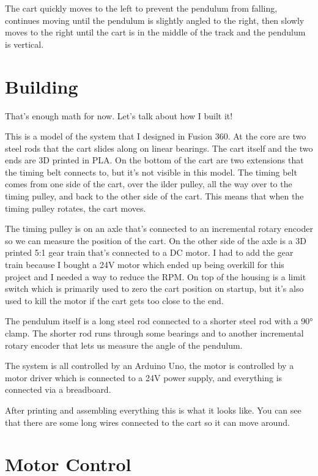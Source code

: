 \documentclass{article}
\begin{document}
The cart quickly moves to the left to prevent the pendulum from falling, continues moving until the pendulum is slightly angled to the right, then slowly moves to the right until the cart is in the middle of the track and the pendulum is vertical.

\section{Building}

That's enough math for now. Let's talk about how I built it!

This is a model of the system that I designed in Fusion 360. At the core are two steel rods that the cart slides along on linear bearings. The cart itself and the two ends are 3D printed in PLA. On the bottom of the cart are two extensions that the timing belt connects to, but it's not visible in this model. The timing belt comes from one side of the cart, over the ilder pulley, all the way over to the timing pulley, and back to the other side of the cart. This means that when the timing pulley rotates, the cart moves.

The timing pulley is on an axle that's connected to an incremental rotary encoder so we can measure the position of the cart. On the other side of the axle is a 3D printed 5:1 gear train that's connected to a DC motor. I had to add the gear train because I bought a 24V motor which ended up being overkill for this project and I needed a way to reduce the RPM. On top of the housing is a limit switch which is primarily used to zero the cart position on startup, but it's also used to kill the motor if the cart gets too close to the end.

The pendulum itself is a long steel rod connected to a shorter steel rod with a 90° clamp. The shorter rod runs through some bearings and to another incremental rotary encoder that lets us measure the angle of the pendulum.

The system is all controlled by an Arduino Uno, the motor is controlled by a motor driver which is connected to a 24V power supply, and everything is connected via a breadboard.

After printing and assembling everything this is what it looks like. You can see that there are some long wires connected to the cart so it can move around.

\section{Motor Control}
\end{document}
